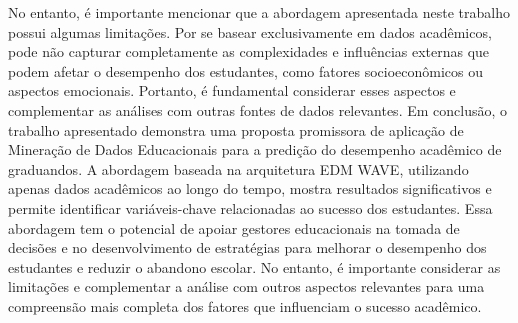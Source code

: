 \documentclass[conference]{IEEEtran}
\begin{document}
No entanto, é importante mencionar que a abordagem apresentada neste trabalho possui algumas limitações. Por se basear exclusivamente em dados acadêmicos, pode não capturar completamente as complexidades e influências externas que podem afetar o desempenho dos estudantes, como fatores socioeconômicos ou aspectos emocionais. Portanto, é fundamental considerar esses aspectos e complementar as análises com outras fontes de dados relevantes.
Em conclusão, o trabalho apresentado demonstra uma proposta promissora de aplicação de Mineração de Dados Educacionais para a predição do desempenho acadêmico de graduandos. A abordagem baseada na arquitetura EDM WAVE, utilizando apenas dados acadêmicos ao longo do tempo, mostra resultados significativos e permite identificar variáveis-chave relacionadas ao sucesso dos estudantes. Essa abordagem tem o potencial de apoiar gestores educacionais na tomada de decisões e no desenvolvimento de estratégias para melhorar o desempenho dos estudantes e reduzir o abandono escolar. No entanto, é importante considerar as limitações e complementar a análise com outros aspectos relevantes para uma compreensão mais completa dos fatores que influenciam o sucesso acadêmico.
\end{document}
